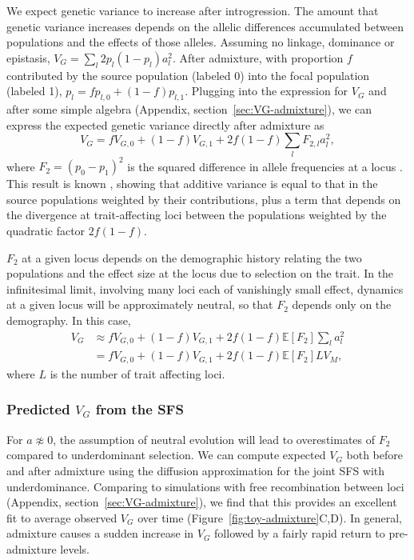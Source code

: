 \documentclass{article}
\begin{document}
We expect genetic variance to increase after introgression. The amount that
genetic variance increases depends on the allelic differences accumulated
between populations and the effects of those alleles. Assuming no linkage,
dominance or epistasis, \(V_G=\sum_l 2p_l(1-p_l)a_l^2\). After admixture, with
proportion $f$ contributed by the source population (labeled 0) into the focal
population (labeled 1), \(p_l = fp_{l,0} + (1-f)p_{l,1}\). Plugging into the
expression for $V_G$ and after some simple algebra (Appendix,
section~\ref{sec:VG-admixture}), we can express the expected genetic variance
directly after admixture as \[V_G = fV_{G,0} + (1-f) V_{G,1} + 2f(1-f)\sum_l
F_{2,l} a_l^2,\] where $F_2 = (p_0 - p_1)^2$ is the squared difference in
allele frequencies at a locus \citep{peter2016admixture}. This result is known
\citep[e.g.,][]{tufto2000quantitative}, showing that additive variance is equal
to that in the source populations weighted by their contributions, plus a term
that depends on the divergence at trait-affecting loci between the populations
weighted by the quadratic factor $2f(1-f)$.

$F_2$ at a given locus depends on the demographic history
relating the two populations and the effect size at the locus due to selection
on the trait. In the infinitesimal limit, involving many loci each of
vanishingly small effect, dynamics at a given locus will be approximately
neutral, so that $F_2$ depends only on the demography. In this case,
\begin{align}
    V_G & \approx f V_{G,0} + (1-f) V_{G,1} + 2f(1-f)\mathbb{E}[F_2] \sum_l a_l^2 \\
    \nonumber
    & = f V_{G,0} + (1-f) V_{G,1} + 2f(1-f)\mathbb{E}[F_2] L V_M,
\end{align}
where $L$ is the number of trait affecting loci.

\subsubsection*{Predicted $V_G$ from the SFS}

For $a \not\approx 0$, the assumption of neutral evolution will lead to
overestimates of $F_2$ compared to underdominant selection. We can compute
expected $V_G$ both before and after admixture using the diffusion
approximation for the joint SFS with underdominance. Comparing to simulations
with free recombination between loci (Appendix,
section~\ref{sec:VG-admixture}), we find that this provides an excellent fit to
average observed $V_G$ over time (Figure~\ref{fig:toy-admixture}C,D). In
general, admixture causes a sudden increase in $V_G$ followed by a fairly rapid
return to pre-admixture levels.
\end{document}
